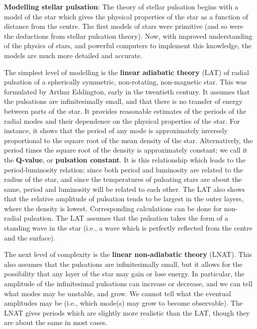 \documentclass[a4paper,10pt]{article}
\begin{document}
{\noindent}\textbf{Modelling stellar pulsation}: The theory of stellar pulsation begins with a model of the star which gives the physical properties of the star as a function of distance from the centre. The first models of stars were primitive (and so were the deductions from stellar pulsation theory). Now, with improved understanding of the physics of stars, and powerful computers to implement this knowledge, the models are much more detailed and accurate.

{\noindent}The simplest level of modelling is the \textbf{linear adiabatic theory} (LAT) of radial pulsation of a spherically symmetric, non-rotating, non-magnetic star. This was formulated by Arthur Eddington, early in the twentieth century. It assumes that the pulsations are infinitesimally small, and that there is no transfer of energy between parts of the star. It provides reasonable estimates of the periods of the radial modes and their dependence on the physical properties of the star. For instance, it shows that the period of any mode is approximately inversely proportional to the square root of the mean density of the star. Alternatively, the period times the square root of the density is approximately constant; we call it the \textbf{Q-value}, or \textbf{pulsation constant}. It is this relationship which leads to the period-luminosity relation; since both period and luminosity are related to the radius of the star, and since the temperatures of pulsating stars are about the same, period and luminosity will be related to each other. The LAT also shows that the relative amplitude of pulsation tends to be largest in the outer layers, where the density is lowest. Corresponding calculations can be done for non-radial pulsation. The LAT assumes that the pulsation takes the form of a standing wave in the star (i.e., a wave which is perfectly reflected from the centre and the surface).

{\noindent}The next level of complexity is the \textbf{linear non-adiabatic theory} (LNAT). This also assumes that the pulsations are infinitesimally small, but it allows for the possibility that any layer of the star may gain or lose energy. In particular, the amplitude of the infinitesimal pulsations can increase or decrease, and we can tell what modes may be unstable, and grow. We cannot tell what the eventual amplitudes may be (i.e., which mode(s) may grow to become observable). The LNAT gives periods which are slightly more realistic than the LAT, though they are about the same in most cases.
\end{document}
